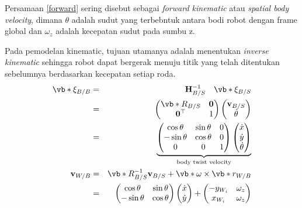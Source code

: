 Persamaan \eqref{forward} sering disebut sebagai \textit{forward kinematic} atau \textit{spatial body velocity}, dimana $\theta$ adalah sudut yang terbebntuk antara bodi robot dengan frame global dan $\omega_z$ adalah kecepatan sudut pada sumbu z. 

Pada pemodelan kinematic, tujuan utamanya adalah menentukan \textit{inverse kinematic} sehingga robot dapat bergerak menuju titik yang telah ditentukan sebelumnya berdasarkan kecepatan setiap roda. 
\begin{eqnarray}
            \vb*{\xi}_{B/B} &=& \mathbf{H}^{-1}_{B/S} \quad \vb*{\xi}_{B/S}\\
            &=& \begin{pmatrix} \vb*{R}_{B/S} & \mathbf{0}\\ \mathbf{0^\top} & 1\end{pmatrix}\begin{pmatrix} \mathbf{v}_{B/S}\\\dot{\theta}\end{pmatrix}\\
            &=& \underbrace{\begin{pmatrix}\cos{\theta} & \sin{\theta} & 0 \\ -\sin{\theta} & \cos{\theta} & 0 \\ 0& 0 & 1\end{pmatrix}\begin{pmatrix}\dot{x}\\\dot{y}\\\dot{\theta}\end{pmatrix}}_\text{body twist velocity}
            \label{inverse1}\\
            \mathbf{v}_{W/B} &=& \vb*{R}^{-1}_{B/S} \mathbf{v}_{B/S} + \vb*{\omega} \times \vb*{r}_{W/B}\\
        &=& \begin{pmatrix}
            \cos{\theta} & \sin{\theta}\\
            -\sin{\theta} & \cos{\theta}
        \end{pmatrix}
        \begin{pmatrix}
            \dot{x}\\
            \dot{y}
        \end{pmatrix}
        + \begin{pmatrix}
            -y_{{W_i}} & \omega_z\\
            x_{{W_i}} & \omega_z
        \end{pmatrix}
        \label{inverse2}
    \end{eqnarray}
